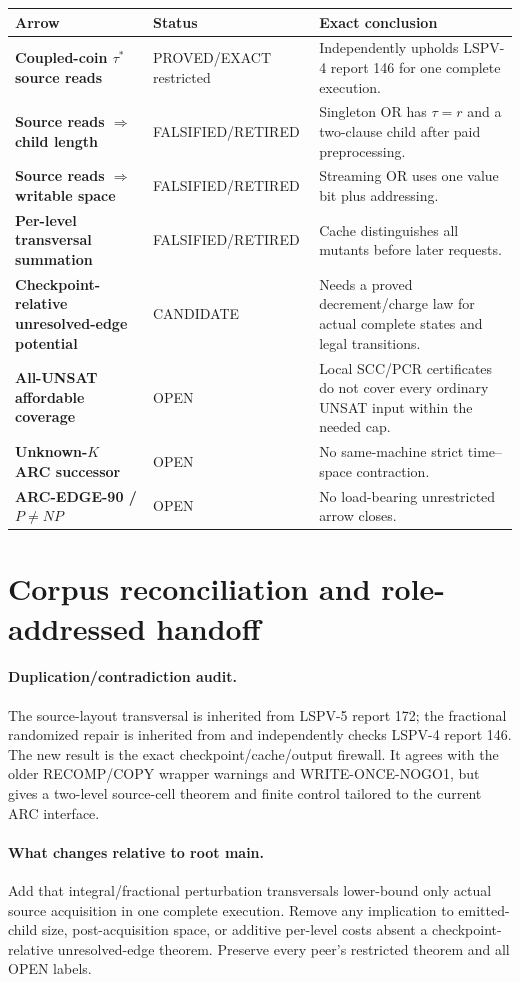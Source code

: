 \documentclass[11pt]{article}
\begin{document}
\begin{center}\small
\begin{tabularx}{.98\linewidth}{>{\bfseries}p{.22\linewidth}p{.18\linewidth}X}
\toprule
Arrow & Status & Exact conclusion\\\midrule
Coupled-coin $\tau^*$ source reads & PROVED/EXACT restricted & Independently upholds LSPV-4 report 146 for one complete execution.\\
Source reads $\Rightarrow$ child length & FALSIFIED/RETIRED & Singleton OR has $\tau=r$ and a two-clause child after paid preprocessing.\\
Source reads $\Rightarrow$ writable space & FALSIFIED/RETIRED & Streaming OR uses one value bit plus addressing.\\
Per-level transversal summation & FALSIFIED/RETIRED & Cache distinguishes all mutants before later requests.\\
Checkpoint-relative unresolved-edge potential & CANDIDATE & Needs a proved decrement/charge law for actual complete states and legal transitions.\\
All-UNSAT affordable coverage & OPEN & Local SCC/PCR certificates do not cover every ordinary UNSAT input within the needed cap.\\
Unknown-$K$ ARC successor & OPEN & No same-machine strict time--space contraction.\\
ARC-EDGE-90 / $P\ne NP$ & OPEN & No load-bearing unrestricted arrow closes.\\\bottomrule
\end{tabularx}
\end{center}

\section{Corpus reconciliation and role-addressed handoff}
\paragraph{Duplication/contradiction audit.}
The source-layout transversal is inherited from LSPV-5 report 172; the fractional randomized repair is inherited from and independently checks LSPV-4 report 146.  The new result is the exact checkpoint/cache/output firewall.  It agrees with the older RECOMP/COPY wrapper warnings and WRITE-ONCE-NOGO1, but gives a two-level source-cell theorem and finite control tailored to the current ARC interface.

\paragraph{What changes relative to root main.}
Add that integral/fractional perturbation transversals lower-bound only actual source acquisition in one complete execution.  Remove any implication to emitted-child size, post-acquisition space, or additive per-level costs absent a checkpoint-relative unresolved-edge theorem.  Preserve every peer's restricted theorem and all OPEN labels.
\end{document}
